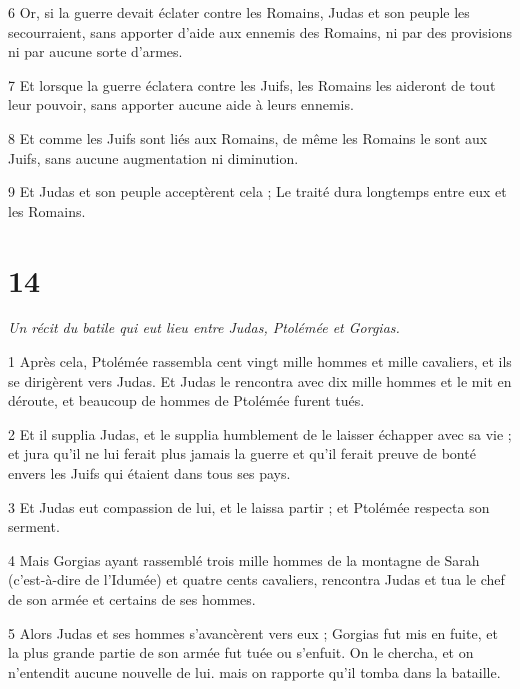 \par 6 Or, si la guerre devait éclater contre les Romains, Judas et son peuple les secourraient, sans apporter d'aide aux ennemis des Romains, ni par des provisions ni par aucune sorte d'armes.

\par 7 Et lorsque la guerre éclatera contre les Juifs, les Romains les aideront de tout leur pouvoir, sans apporter aucune aide à leurs ennemis.

\par 8 Et comme les Juifs sont liés aux Romains, de même les Romains le sont aux Juifs, sans aucune augmentation ni diminution.

\par 9 Et Judas et son peuple acceptèrent cela ; Le traité dura longtemps entre eux et les Romains.

\chapter{14}

\par \textit{Un récit du batile qui eut lieu entre Judas, Ptolémée et Gorgias.}

\par 1 Après cela, Ptolémée rassembla cent vingt mille hommes et mille cavaliers, et ils se dirigèrent vers Judas. Et Judas le rencontra avec dix mille hommes et le mit en déroute, et beaucoup de hommes de Ptolémée furent tués.

\par 2 Et il supplia Judas, et le supplia humblement de le laisser échapper avec sa vie ; et jura qu'il ne lui ferait plus jamais la guerre et qu'il ferait preuve de bonté envers les Juifs qui étaient dans tous ses pays.

\par 3 Et Judas eut compassion de lui, et le laissa partir ; et Ptolémée respecta son serment.

\par 4 Mais Gorgias ayant rassemblé trois mille hommes de la montagne de Sarah (c'est-à-dire de l'Idumée) et quatre cents cavaliers, rencontra Judas et tua le chef de son armée et certains de ses hommes.

\par 5 Alors Judas et ses hommes s'avancèrent vers eux ; Gorgias fut mis en fuite, et la plus grande partie de son armée fut tuée ou s'enfuit. On le chercha, et on n'entendit aucune nouvelle de lui. mais on rapporte qu'il tomba dans la bataille.

